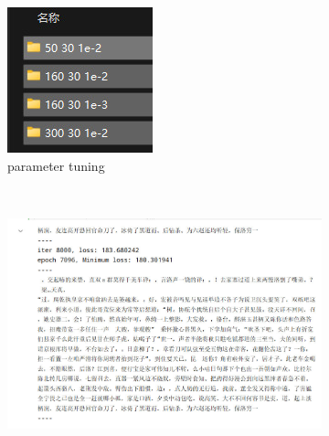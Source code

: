 \documentclass[letterpaper,12pt]{article}
\begin{document}
			
			\begin{figure}[htbp] 
				\centering 
				\begin{subfigure}{0.19\textwidth}
					\includegraphics[width=\linewidth]{RNN/parameter_tuning}
					\captionsetup{font=scriptsize}
					\caption{parameter tuning}
					\label{fig: parameter_tuning}
				\end{subfigure} \\
				\begin{subfigure}{0.45\textwidth}
					\includegraphics[width=\linewidth]{RNN/result_1}

\end{subfigure}
\end{figure}
\end{document}
